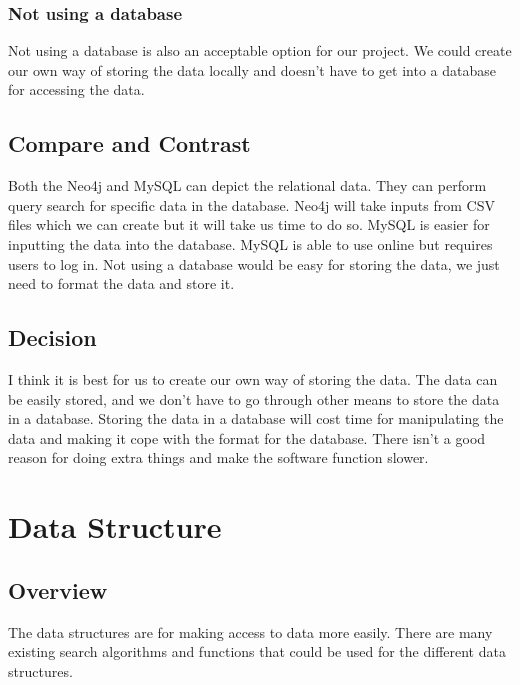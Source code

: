 \documentclass[onecolumn, draftclsnofoot,10pt, compsoc]{IEEEtran}
\begin{document}
\subsubsection{Not using a database}
\begin{singlespace}
Not using a database is also an acceptable option for our project. We could create our own way of storing the data locally and doesn't have to get into a database for accessing the data. 
\end{singlespace}

\subsection{Compare and Contrast}
\begin{singlespace}
Both the Neo4j and MySQL can depict the relational data. They can perform query search for specific data in the database. Neo4j will take inputs from CSV files which we can create but it will take us time to do so. MySQL is easier for inputting the data into the database. MySQL is able to use online but requires users to log in. Not using a database would be easy for storing the data, we just need to format the data and store it.
\end{singlespace}

\subsection{Decision}
\begin{singlespace}
I think it is best for us to create our own way of storing the data. The data can be easily stored, and we don't have to go through other means to store the data in a database. Storing the data in a database will cost time for manipulating the data and making it cope with the format for the database. There isn't a good reason for doing extra things and make the software function slower.  
\end{singlespace}


\section{Data Structure}
\subsection{Overview}
\begin{singlespace}
The data structures are for making access to data more easily. There are many existing search algorithms and functions that could be used for the different data structures. 
\end{singlespace}
\end{document}
